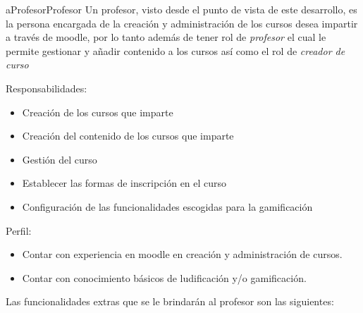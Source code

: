     \begin{actor}{aProfesor}{Profesor}{%
    Un profesor, visto desde el punto de vista de este desarrollo, es la persona
    encargada de la creación y administración de los cursos desea impartir a través
    de moodle, por lo tanto además de tener rol de {\it profesor} el cual le permite
    gestionar y añadir contenido a los cursos así como el rol de {\it creador de
    curso} \cite{MoodleRoles} \\}

    \item[Responsabilidades:] \hfill
        \begin{itemize}
        \item Creación de los cursos que imparte
        \item Creación del contenido de los cursos que imparte
        \item Gestión del curso
        \item Establecer las formas de inscripción en el curso
        \item Configuración de las funcionalidades escogidas para la gamificación
        \end{itemize}

    \item[Perfil:] \hfill
        \begin{itemize}
        \item Contar con experiencia en moodle en creación y administración de cursos.
        \item Contar con conocimiento básicos de ludificación y/o gamificación.
        \end{itemize}
    \end{actor}

    \noindent
    Las funcionalidades extras que se le brindarán al profesor son las siguientes:

